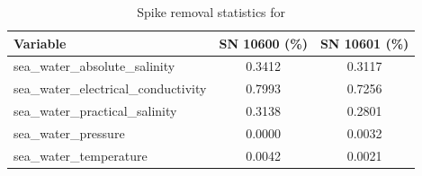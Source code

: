 \begin{table}[h]
\centering
\caption{Spike removal statistics for \projectname{} \casenumber{}}
\label{tab:spike_stats}
\begin{tabular}{|l|c|c|}
\hline
Variable & SN 10600 (\%) & SN 10601 (\%) \\
\hline
sea\_water\_absolute\_salinity & 0.3412 & 0.3117 \\
sea\_water\_electrical\_conductivity & 0.7993 & 0.7256 \\
sea\_water\_practical\_salinity & 0.3138 & 0.2801 \\
sea\_water\_pressure & 0.0000 & 0.0032 \\
sea\_water\_temperature & 0.0042 & 0.0021 \\
\hline
\end{tabular}
\end{table}
